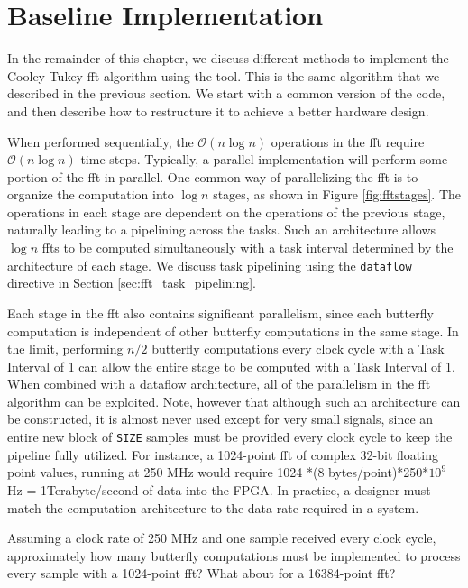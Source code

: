 \section{Baseline Implementation}

In the remainder of this chapter, we discuss different methods to implement the Cooley-Tukey \gls{fft} \cite{cooley65} algorithm using the \VHLS tool. This is the same algorithm that we described in the previous section. We start with a common version of the code, and then describe how to restructure it to achieve a better hardware design. 

When performed sequentially, the $\mathcal{O}(n \log n)$ operations in the \gls{fft} require $\mathcal{O}(n \log n)$ time steps.   Typically, a parallel implementation will perform some portion of the \gls{fft} in parallel.  One common way of parallelizing the \gls{fft} is to organize the computation into $\log n$ stages, as shown in Figure \ref{fig:fftstages}.  The operations in each stage are dependent on the operations of the previous stage, naturally leading to a pipelining across the tasks.  Such an architecture allows $\log n$ \gls{fft}s to be computed simultaneously with a task interval determined by the architecture of each stage.  We discuss task pipelining using the \lstinline|dataflow| directive in Section \ref{sec:fft_task_pipelining}.

Each stage in the \gls{fft} also contains significant parallelism, since each butterfly computation is independent of other butterfly computations in the same stage.  In the limit, performing $n/2$ butterfly computations every clock cycle with a Task Interval of 1 can allow the entire stage to be computed with a Task Interval of 1.  When combined with a dataflow architecture, all of the parallelism in the \gls{fft} algorithm can be exploited.  Note, however that although such an architecture can be constructed, it is almost never used except for very small signals, since an entire new block of \lstinline|SIZE| samples must be provided every clock cycle to keep the pipeline fully utilized.  For instance, a 1024-point \gls{fft} of complex 32-bit floating point values, running at 250 MHz would require 1024 *(8 {bytes}/{point})*250*$10^9$ Hz = 1Terabyte/second of data into the FPGA.   In practice, a designer must match the computation architecture to the data rate required in a system.

\begin{exercise}
Assuming a clock rate of 250 MHz and one sample received every clock cycle, approximately how many butterfly computations must be implemented to process every sample with a 1024-point \gls{fft}?  What about for a 16384-point \gls{fft}?
\end{exercise}

